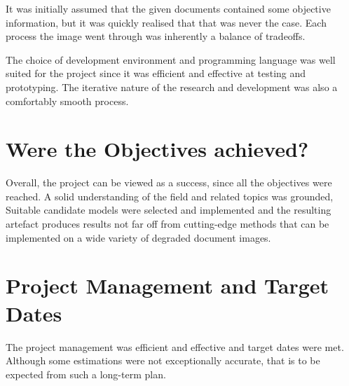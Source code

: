 \documentclass[a4paper, 12pt]{report}
\begin{document}
It was initially assumed that the given documents contained some objective information, but it was quickly realised that that was never the case. Each process the image went through was inherently a balance of tradeoffs. \par

The choice of development environment and programming language was well suited for the project since it was efficient and effective at testing and prototyping. The iterative nature of the research and development was also a comfortably smooth process.

\section{Were the Objectives achieved?}
Overall, the project can be viewed as a success, since all the objectives were reached. A solid understanding of the field and related topics was grounded, Suitable candidate models were selected and implemented and the resulting artefact produces results not far off from cutting-edge methods that can be implemented on a wide variety of degraded document images.

\section{Project Management and Target Dates}
The project management was efficient and effective and target dates were met. Although some estimations were not exceptionally accurate, that is to be expected from such a long-term plan.

\newpage
\printbibliography
\end{document}
